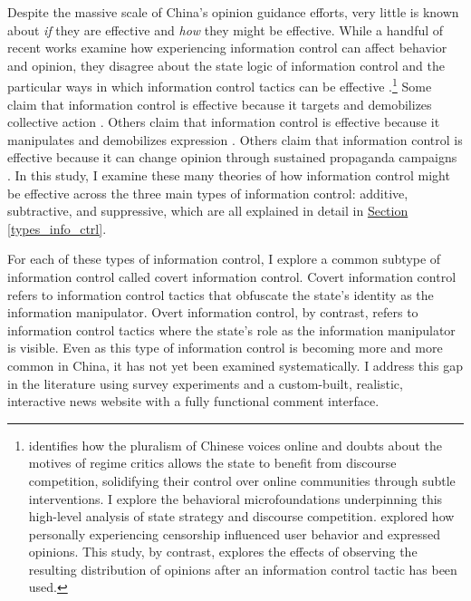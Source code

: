 \documentclass[11pt]{article}
\begin{document}
Despite the massive scale of China's opinion guidance efforts, very little is known about {\it if} they are effective and {\it how} they might be effective. While a handful of recent works examine how experiencing information control can affect behavior and opinion, they disagree about the state logic of information control and the particular ways in which information control tactics can be effective \citep{han2018contesting,roberts2018censored}.\footnote{\citep{han2018contesting} identifies how the pluralism of Chinese voices online and doubts about the motives of regime critics allows the state to benefit from discourse competition, solidifying their control over online communities through subtle interventions. I explore the behavioral microfoundations underpinning this high-level analysis of state strategy and discourse competition. \cite{roberts2018censored} explored how personally experiencing censorship influenced user behavior and expressed opinions. This study, by contrast, explores the effects of observing the resulting distribution of opinions after an information control tactic has been used.} Some claim that information control is effective because it targets and demobilizes collective action \citep{king2013censorship,king2014reverse,havel1978power,arendt1973origins}. Others claim that information control is effective because it manipulates and demobilizes expression \citep{kuran1991now,wedeen1999ambiguities}. Others claim that information control is effective because it can change opinion through sustained propaganda campaigns \citep{geddes1989sources}. In this study, I examine these many theories of how information control might be effective across the three main types of information control: additive, subtractive, and suppressive, which are all explained in detail in \hyperref[types_info_ctrl]{Section \ref*{types_info_ctrl}}.

For each of these types of information control, I explore a common subtype of information control called covert information control. Covert information control refers to information control tactics that obfuscate the state's identity as the information manipulator. Overt information control, by contrast, refers to information control tactics where the state's role as the information manipulator is visible. Even as this type of information control is becoming more and more common in China, it has not yet been examined systematically. I address this gap in the literature using  survey experiments and a custom-built, realistic, interactive news website with a fully functional comment interface.
\end{document}
